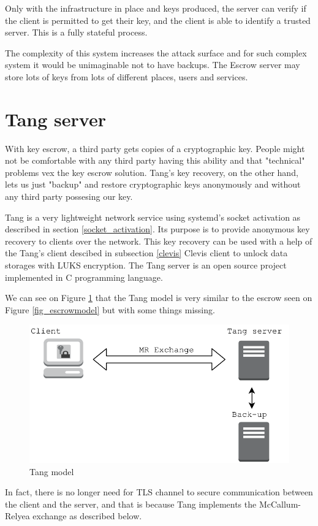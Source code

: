 Only with the infrastructure in place and keys produced, the server can verify if the client is permitted to get their key, and the client is able to identify a trusted server.
This is a fully stateful process.

The complexity of this system increases the attack surface and for such complex system it would be unimaginable not to have backups.
The Escrow server may store lots of keys from lots of different places, users and services.



\section{Tang server}\label{tang}

With key escrow, a third party gets copies of a cryptographic key.
People might not be comfortable with any third party having this ability and that "technical" problems vex the key escrow solution.
Tang's key recovery, on the other hand, lets us just "backup" and restore cryptographic keys anonymously and without any third party possesing our key.

Tang is a very lightweight network service using systemd's socket activation as described in section \ref{socket_activation}.
Its purpose is to provide anonymous key recovery to clients over the network.
This key recovery can be used with a help of the Tang's client descibed in subsection \ref{clevis} Clevis client to unlock data storages with LUKS encryption.
The Tang server is an open source project implemented in C programming language.

We can see on Figure \ref{fig_tangmodel} that the Tang model is very similar to the escrow seen on Figure \ref{fig_escrowmodel} but with some things missing.
\begin{figure}[h]
    \centering
    \includegraphics[scale=0.7]{figures/TangModel.pdf}
    \caption{Tang model}
    \label{fig_tangmodel}
\end{figure}
In fact, there is no longer need for TLS channel to secure communication between the client and the server,
 and that is because Tang implements the McCallum-Relyea exchange as described below.

